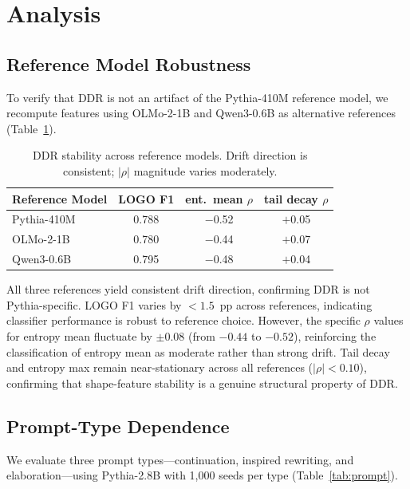 \documentclass[11pt,a4paper]{article}
\begin{document}
\section{Analysis}

\subsection{Reference Model Robustness}

To verify that DDR is not an artifact of the Pythia-410M reference model, we recompute features using OLMo-2-1B and Qwen3-0.6B as alternative references (Table~\ref{tab:refmodel}).

\begin{table}[t]
\centering
\small
\caption{DDR stability across reference models. Drift direction is consistent; $|\rho|$ magnitude varies moderately.}
\label{tab:refmodel}
\begin{tabular}{lccc}
\toprule
\textbf{Reference Model} & \textbf{LOGO F1} & \textbf{ent.\ mean $\rho$} & \textbf{tail decay $\rho$} \\
\midrule
Pythia-410M & 0.788 & $-$0.52 & $+$0.05 \\
OLMo-2-1B & 0.780 & $-$0.44 & $+$0.07 \\
Qwen3-0.6B & 0.795 & $-$0.48 & $+$0.04 \\
\bottomrule
\end{tabular}
\end{table}

All three references yield consistent drift direction, confirming DDR is not Pythia-specific.
LOGO F1 varies by $< 1.5$~pp across references, indicating classifier performance is robust to reference choice.
However, the specific $\rho$ values for entropy mean fluctuate by $\pm 0.08$ (from $-0.44$ to $-0.52$), reinforcing the classification of entropy mean as moderate rather than strong drift.
Tail decay and entropy max remain near-stationary across all references ($|\rho| < 0.10$), confirming that shape-feature stability is a genuine structural property of DDR.

\subsection{Prompt-Type Dependence}

We evaluate three prompt types---continuation, inspired rewriting, and elaboration---using Pythia-2.8B with 1,000 seeds per type (Table~\ref{tab:prompt}).
\end{document}

